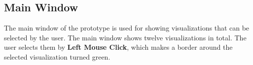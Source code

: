     \subsection{Main Window}
    The main window of the prototype is used for showing visualizations that can be selected by the user. The main window shows twelve visualizations in total. The user selects them by \textbf{Left Mouse Click}, which makes a border around the selected visualization turned green.

    \begin{landscape}
    \end{landscape}

